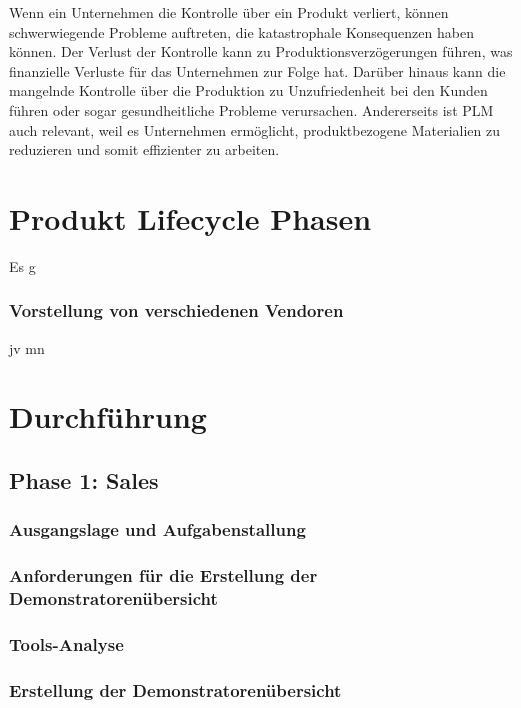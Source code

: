 \documentclass[a4paper, 12pt]{scrartcl}
\begin{document}
Wenn ein Unternehmen die Kontrolle über ein Produkt verliert, können schwerwiegende Probleme auftreten, die katastrophale Konsequenzen haben können. Der Verlust der Kontrolle kann zu Produktionsverzögerungen führen, was finanzielle Verluste für das Unternehmen zur Folge hat. Darüber hinaus kann die mangelnde Kontrolle über die Produktion zu Unzufriedenheit bei den Kunden führen oder sogar gesundheitliche Probleme verursachen. Andererseits ist PLM auch relevant, weil es Unternehmen ermöglicht, produktbezogene Materialien zu reduzieren und somit effizienter zu arbeiten.\cite{stark2011product}
	\section*{\normalsize Produkt Lifecycle Phasen}
Es g

	\subsubsection{Vorstellung von verschiedenen Vendoren}
jv mn 
	\newpage
	\section{Durchführung}
	\subsection{Phase 1: Sales} 
	\subsubsection{Ausgangslage und Aufgabenstallung} %
	\subsubsection{Anforderungen für die Erstellung der Demonstratorenübersicht} %
	\subsubsection{Tools-Analyse}%
	\subsubsection{Erstellung der Demonstratorenübersicht}
	\newpage
\end{document}
